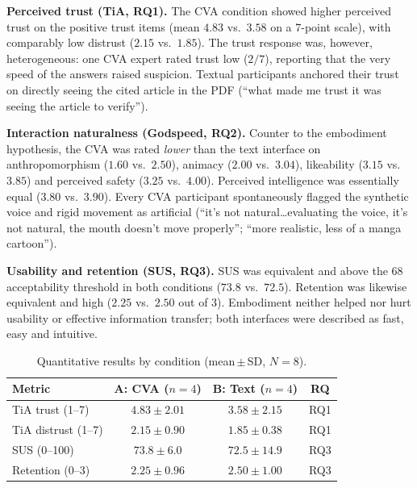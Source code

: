 \documentclass[conference]{IEEEtran}
\begin{document}
\textbf{Perceived trust (TiA, RQ1).}
The CVA condition showed higher perceived trust on the positive trust items
(mean $4.83$ vs.\ $3.58$ on a 7-point scale), with comparably low distrust
($2.15$ vs.\ $1.85$). The trust response was, however, heterogeneous: one CVA
expert rated trust low ($2/7$), reporting that the very speed of the answers
raised suspicion. Textual participants anchored their trust on directly seeing
the cited article in the PDF (``what made me trust it was seeing the article to
verify'').

\textbf{Interaction naturalness (Godspeed, RQ2).}
Counter to the embodiment hypothesis, the CVA was rated \emph{lower} than the
text interface on anthropomorphism ($1.60$ vs.\ $2.50$), animacy
($2.00$ vs.\ $3.04$), likeability ($3.15$ vs.\ $3.85$) and perceived safety
($3.25$ vs.\ $4.00$). Perceived intelligence was essentially equal
($3.80$ vs.\ $3.90$). Every CVA participant spontaneously flagged the synthetic
voice and rigid movement as artificial (``it's not natural\dots evaluating the
voice, it's not natural, the mouth doesn't move properly''; ``more realistic,
less of a manga cartoon'').

\textbf{Usability and retention (SUS, RQ3).}
SUS was equivalent and above the $68$ acceptability threshold in both conditions
($73.8$ vs.\ $72.5$). Retention was likewise equivalent and high
($2.25$ vs.\ $2.50$ out of $3$). Embodiment neither helped nor hurt usability or
effective information transfer; both interfaces were described as fast, easy and
intuitive.

\begin{table}[t]
\caption{Quantitative results by condition (mean\,$\pm$\,SD, $N=8$).}
\label{tab:quant}
\centering
\renewcommand{\arraystretch}{1.2}
\begin{tabular}{@{}lccc@{}}
\toprule
\textbf{Metric} & \textbf{A: CVA} ($n{=}4$) & \textbf{B: Text} ($n{=}4$) & \textbf{RQ} \\
\midrule
TiA trust (1--7)      & $4.83 \pm 2.01$ & $3.58 \pm 2.15$ & RQ1 \\
TiA distrust (1--7)   & $2.15 \pm 0.90$ & $1.85 \pm 0.38$ & RQ1 \\
SUS (0--100)          & $73.8 \pm 6.0$  & $72.5 \pm 14.9$ & RQ3 \\
Retention (0--3)      & $2.25 \pm 0.96$ & $2.50 \pm 1.00$ & RQ3 \\
\bottomrule
\end{tabular}
\end{table}
\end{document}
